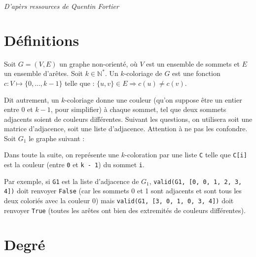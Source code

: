 \textit{D'apèrs ressources de Quentin Fortier}

\section{Définitions}
Soit $G = (V, E)$ un graphe non-orienté, où $V$ est un ensemble de sommets et $E$ un ensemble d’arêtes. Soit $k\in\mathbb{N}^*$. Un
$k$-coloriage de $G$ est une fonction $c : V \mapsto \{0, ..., k - 1\}$ telle que :
$\{u, v\} \in E\Rightarrow c(u) \neq c(v)$.

Dit autrement, un $k$-coloriage donne une couleur (qu’on suppose être un entier entre 0 et $k-1$, pour simplifier) à chaque sommet,
tel que deux sommets adjacents soient de couleurs différentes.
Suivant les questions, on utilisera soit une matrice d’adjacence, soit une liste d’adjacence. Attention à ne pas les confondre.
Soit $G_1$ le graphe suivant :





Dans toute la suite, on représente une $k$-coloration par une liste \lstinline{C} telle que \lstinline{C[i]} est la couleur (entre \lstinline{0} et \lstinline{k - 1})
du sommet \lstinline{i}.


Par exemple, si \lstinline{G1} est la liste d’adjacence de $G_1$, \lstinline{valid(G1, [0, 0, 1, 2, 3, 4])} doit renvoyer \lstinline{False} (car les sommets
0 et 1 sont adjacents et sont tous les deux coloriés avec la couleur 0) mais \lstinline{valid(G1, [3, 0, 1, 0, 3, 4])} doit renvoyer
\lstinline{True} (toutes les arêtes ont bien des extremités de couleurs différentes).



\section{Degré}

